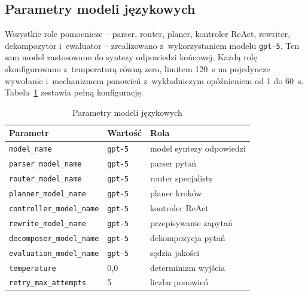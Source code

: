   \subsection{Parametry modeli językowych}\label{subsec:parametry-modeli}

  Wszystkie role pomocnicze -- parser, router, planer, kontroler ReAct, rewriter,
  dekompozytor i~ewaluator -- zrealizowano z~wykorzystaniem modelu
  \texttt{gpt-5}. Ten sam model zastosowano do syntezy odpowiedzi końcowej. Każdą
  rolę skonfigurowano z~temperaturą równą zero, limitem 120~s na pojedyncze
  wywołanie i~mechanizmem ponowień z~wykładniczym opóźnieniem od 1 do 60~s.
  Tabela~\ref{tab:parametry-modeli} zestawia pełną konfigurację.

  \begin{table}[H]
    \caption{Parametry modeli językowych}\label{tab:parametry-modeli}
    \centering
    \small
    \renewcommand{\arraystretch}{1.3}
    \begin{tabular}{@{} l l l @{}}
      \toprule
      \textbf{Parametr}
      & \textbf{Wartość}
      & \textbf{Rola}                                               \\
      \midrule
      \texttt{model\_name}
      & \texttt{gpt-5}   & model syntezy odpowiedzi                 \\
      \texttt{parser\_model\_name}
      & \texttt{gpt-5}   & parser pytań                             \\
      \texttt{router\_model\_name}
      & \texttt{gpt-5}   & router specjalisty                       \\
      \texttt{planner\_model\_name}
      & \texttt{gpt-5}   & planer kroków                            \\
      \texttt{controller\_model\_name}
      & \texttt{gpt-5}   & kontroler ReAct                          \\
      \texttt{rewrite\_model\_name}
      & \texttt{gpt-5}   & przepisywanie zapytań                    \\
      \texttt{decomposer\_model\_name}
      & \texttt{gpt-5}   & dekompozycja pytań                       \\
      \texttt{evaluation\_model\_name}
      & \texttt{gpt-5}   & sędzia jakości                           \\
      \texttt{temperature}
      & 0{,}0             & determinizm wyjścia                      \\
      \texttt{retry\_max\_attempts}
      & 5                & liczba ponowień                          \\

\end{tabular}
\end{table}
